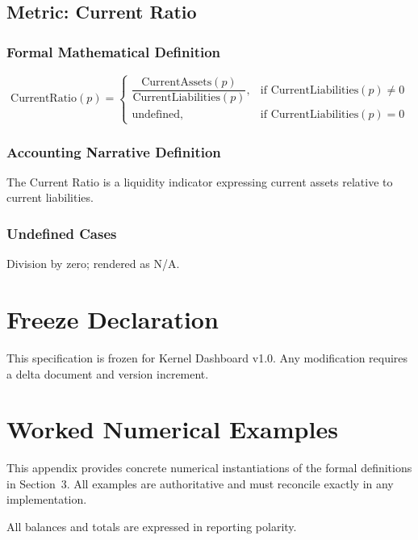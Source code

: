 \documentclass[11pt]{article}
\newcommand{\Period}{p}
\begin{document}
\subsection{Metric: Current Ratio}

\subsubsection*{Formal Mathematical Definition}
\[
\text{CurrentRatio}(\Period)
=
\begin{cases}
\dfrac{\text{CurrentAssets}(\Period)}
      {\text{CurrentLiabilities}(\Period)},
& \text{if } \text{CurrentLiabilities}(\Period) \neq 0
\\[1em]
\text{undefined},
& \text{if } \text{CurrentLiabilities}(\Period) = 0
\end{cases}
\]

\subsubsection*{Accounting Narrative Definition}
The Current Ratio is a liquidity indicator expressing current assets
relative to current liabilities.

\subsubsection*{Undefined Cases}
Division by zero; rendered as N/A.

\section*{Freeze Declaration}
This specification is frozen for Kernel Dashboard v1.0.
Any modification requires a delta document and version increment.

\appendix
\section{Worked Numerical Examples}

This appendix provides concrete numerical instantiations of the
formal definitions in Section~3.
All examples are authoritative and must reconcile exactly in any
implementation.

All balances and totals are expressed in reporting polarity.
\end{document}
